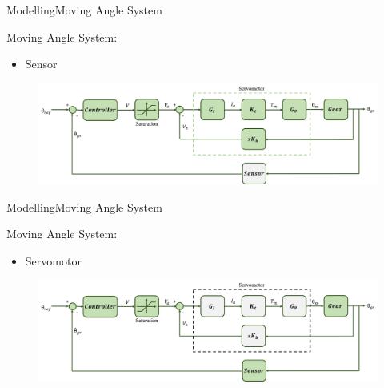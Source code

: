 \begin{frame}{Modelling}{Moving Angle System}
  \begin{block}{Moving Angle System:}

	  \begin{itemize}
	  	\item Sensor
	  \end{itemize}

	  \begin{figure}
        \includegraphics[scale=0.26]{../report/figures/servo+gear+noise+sensor.png}
      \end{figure}
  
  \end{block}
\end{frame}

\begin{frame}{Modelling}{Moving Angle System}
  \begin{block}{Moving Angle System:}

	  \begin{itemize}
	  	\item Servomotor
	  \end{itemize}

	  \begin{figure}
        \includegraphics[scale=0.26]{../report/figures/servo+gear+noise+servomotor.png}
      \end{figure}
  
  \end{block}
\end{frame}

